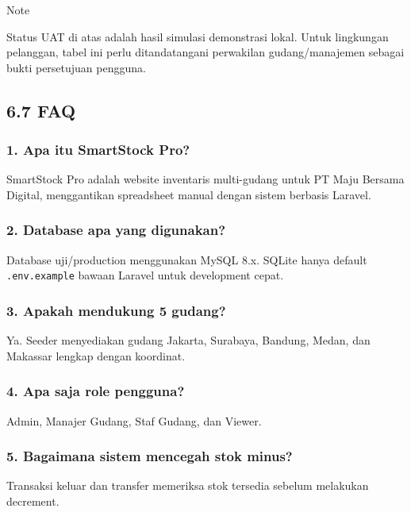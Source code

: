 \documentclass[
]{article}
\begin{document}
Note

Status UAT di atas adalah hasil simulasi demonstrasi lokal. Untuk
lingkungan pelanggan, tabel ini perlu ditandatangani perwakilan
gudang/manajemen sebagai bukti persetujuan pengguna.

\subsection{6.7 FAQ}\label{67-faq}

\subsubsection{1. Apa itu SmartStock
Pro?}\label{1-apa-itu-smartstock-pro}

SmartStock Pro adalah website inventaris multi-gudang untuk PT Maju
Bersama Digital, menggantikan spreadsheet manual dengan sistem berbasis
Laravel.

\subsubsection{2. Database apa yang
digunakan?}\label{2-database-apa-yang-digunakan}

Database uji/production menggunakan MySQL 8.x. SQLite hanya default
\texttt{.env.example} bawaan Laravel untuk development cepat.

\subsubsection{3. Apakah mendukung 5
gudang?}\label{3-apakah-mendukung-5-gudang}

Ya. Seeder menyediakan gudang Jakarta, Surabaya, Bandung, Medan, dan
Makassar lengkap dengan koordinat.

\subsubsection{4. Apa saja role
pengguna?}\label{4-apa-saja-role-pengguna}

Admin, Manajer Gudang, Staf Gudang, dan Viewer.

\subsubsection{5. Bagaimana sistem mencegah stok
minus?}\label{5-bagaimana-sistem-mencegah-stok-minus}

Transaksi keluar dan transfer memeriksa stok tersedia sebelum melakukan
decrement.
\end{document}
